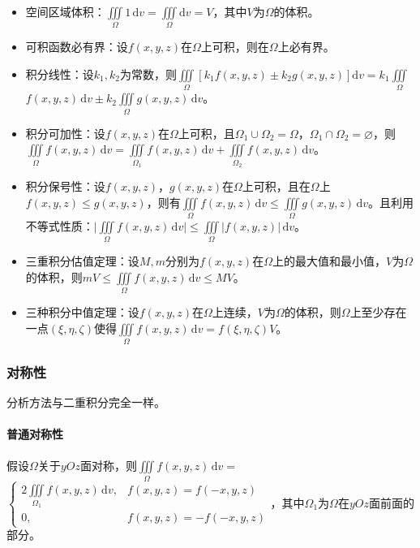 \documentclass[UTF8, 12pt]{ctexart}
\begin{document}
\begin{itemize}
    \item 空间区域体积：$\iiint\limits_\Omega1\,\textrm{d}v=\iiint\limits_\Omega\textrm{d}v=V$，其中$V$为$\Omega$的体积。
    \item 可积函数必有界：设$f(x,y,z)$在$\Omega$上可积，则在$\Omega$上必有界。
    \item 积分线性：设$k_1,k_2$为常数，则$\iiint\limits_\Omega[k_1f(x,y,z)\pm k_2g(x,y,z)]\textrm{d}v=k_1\iiint\limits_\Omega$\\$f(x,y,z)\,\textrm{d}v\pm k_2\iiint\limits_\Omega g(x,y,z)\,\textrm{d}v$。
    \item 积分可加性：设$f(x,y,z)$在$\Omega$上可积，且$\Omega_1\cup\Omega_2=\Omega$，$\Omega_1\cap\Omega_2=\varnothing$，则$\iiint\limits_\Omega f(x,y,z)\,\textrm{d}v=\iiint\limits_{\Omega_1}f(x,y,z)\,\textrm{d}v+\iiint\limits_{\Omega_2}f(x,y,z)\,\textrm{d}v$。
    \item 积分保号性：设$f(x,y,z)$，$g(x,y,z)$在$\Omega$上可积，且在$\Omega$上$f(x,y,z)\leqslant g(x,y,z)$，则有$\iiint\limits_\Omega f(x,y,z)\,\textrm{d}v\leqslant\iiint\limits_\Omega g(x,y,z)\,\textrm{d}v$。且利用不等式性质：$\vert\iiint\limits_\Omega f(x,y,z)\,\textrm{d}v\vert\leqslant\iiint\limits_\Omega\vert f(x,y,z)\vert\,\textrm{d}v$。
    \item 三重积分估值定理：设$M,m$分别为$f(x,y,z)$在$\Omega$上的最大值和最小值，$V$为$\Omega$的体积，则$mV\leqslant\iiint\limits_\Omega f(x,y,z)\,\textrm{d}v\leqslant MV$。
    \item 三种积分中值定理：设$f(x,y,z)$在$\Omega$上连续，$V$为$\Omega$的体积，则$\Omega$上至少存在一点$(\xi,\eta,\zeta)$使得$\iiint\limits_\Omega f(x,y,z)\,\textrm{d}v=f(\xi,\eta,\zeta)V$。
\end{itemize}

\subsubsection{对称性}

分析方法与二重积分完全一样。

\paragraph{普通对称性} \leavevmode \medskip

假设$\Omega$关于$yOz$面对称，则$\iiint\limits_\Omega f(x,y,z)\,\textrm{d}v=$\\$\left\{\begin{array}{ll}
    2\iiint\limits_{\Omega_1}f(x,y,z)\,\textrm{d}v, & f(x,y,z)=f(-x,y,z) \\
    0, & f(x,y,z)=-f(-x,y,z)
\end{array}\right.$，其中$\Omega_1$为$\Omega$在$yOz$面前面的部分。
\end{document}
